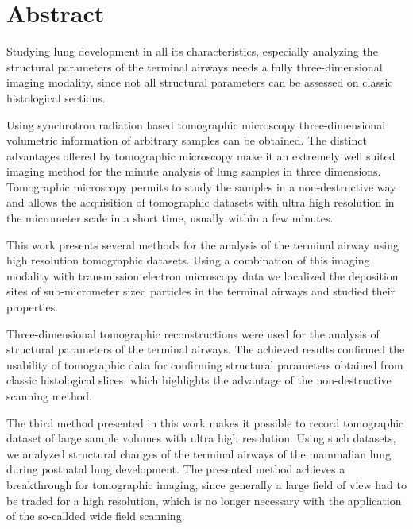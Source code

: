 %
\begingroup%
\let\clearpage\relax%
\let\cleardoublepage\relax%
\let\cleardoublepage\relax%
\chapter*{Abstract}%
Studying lung development in all its characteristics, especially analyzing the structural parameters of the terminal airways needs a fully three-dimensional imaging modality, since not all structural parameters can be assessed on classic histological sections.

Using synchrotron radiation based tomographic microscopy three-dimensional volumetric information of arbitrary samples can be obtained. The distinct advantages offered by tomographic microscopy make it an extremely well suited imaging method for the minute analysis of lung samples in three dimensions. Tomographic microscopy permits to study the samples in a non-destructive way and allows the acquisition of tomographic datasets with ultra high resolution in the micrometer scale in a short time, usually within a few minutes.

This work presents several methods for the analysis of the terminal airway using high resolution tomographic datasets. Using a combination of this imaging modality with transmission electron microscopy data we localized the deposition sites of sub-micrometer sized particles in the terminal airways and studied their properties.

Three-dimensional tomographic reconstructions were used for the analysis of structural parameters of the terminal airways. The achieved results confirmed the usability of tomographic data for confirming structural parameters obtained from classic histological slices, which highlights the advantage of the non-destructive scanning method.

The third method presented in this work makes it possible to record tomographic dataset of large sample volumes with ultra high resolution. Using such datasets, we analyzed structural changes of the terminal airways of the mammalian lung during postnatal lung development. The presented method achieves a breakthrough for tomographic imaging, since generally a large field of view had to be traded for a high resolution, which is no longer necessary with the application of the so-callded wide field scanning.
\endgroup%